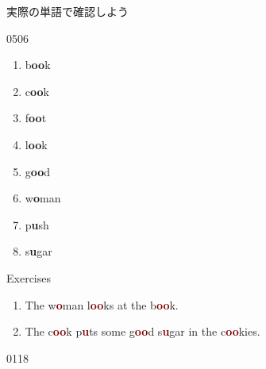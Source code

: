 \documentclass[aspectratio=169,xcolor={dvipsnames,table}]{beamer}
\begin{document}
\begin{frame}[plain]{実際の単語で確認しよう}

\LARGE
\hfill{\tiny 0506}\,{\scriptsize {}}

\begin{enumerate}
 \item b\textcolor{NavyBlue}{\bfseries oo}k%
\hfill{}\hspace{150pt}\mbox{}
 \item c\textcolor{NavyBlue}{\bfseries oo}k%
\hfill{}\hspace{150pt}\mbox{}
\item f\textcolor{NavyBlue}{\bfseries oo}t%
\hfill{}\hspace{150pt}\mbox{}
 \item l\textcolor{NavyBlue}{\bfseries oo}k%
\hfill{}\hspace{150pt}\mbox{}
 \item g\textcolor{NavyBlue}{\bfseries oo}d%
\hfill{}\hspace{150pt}\mbox{}
 \item w\textcolor{NavyBlue}{\bfseries o}man%
\hfill{}\hspace{150pt}\mbox{} 
 \item p\textcolor{NavyBlue}{\bfseries u}sh%
\hfill{}\hspace{150pt}\mbox{}
 \item s\textcolor{NavyBlue}{\bfseries u}gar%
\hfill{}\hspace{150pt}\mbox{}
\end{enumerate}
\end{frame}
\begin{frame}[plain]{Exercises }
\LARGE
\begin{enumerate}
 \item The w\textcolor{Maroon}{\bfseries o}man l\textcolor{Maroon}{\bfseries oo}ks at the b\textcolor{Maroon}{\bfseries oo}k.
 \item The c\textcolor{Maroon}{\bfseries oo}k p\textcolor{Maroon}{\bfseries u}ts some g\textcolor{Maroon}{\bfseries oo}d s\textcolor{Maroon}{\bfseries u}gar in the c\textcolor{Maroon}{\bfseries oo}kies.
\end{enumerate}
\hfill{\tiny 0118}\,{\scriptsize {}}

\end{frame}
\end{document}
